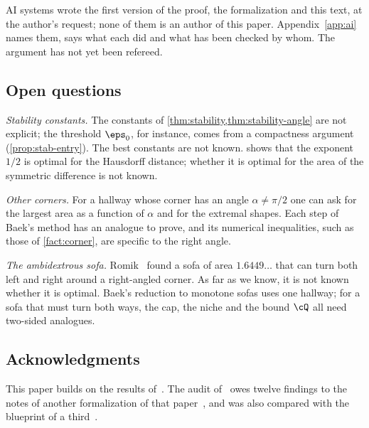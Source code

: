 AI systems wrote the first version of the proof, the formalization and this
text, at the author's request; none of them is an author of this paper.
Appendix~\ref{app:ai} names them, says what each did and what has been checked
by whom.
The argument has not yet been refereed.

\subsection{Open questions}

\emph{Stability constants.} The constants of
\cref{thm:stability,thm:stability-angle} are not explicit; the threshold
$\eps_0$, for instance, comes from a compactness argument
(\cref{prop:stab-entry}). The best constants are not known.
 shows that the exponent $1/2$ is optimal for the
Hausdorff distance; whether it is optimal for the area of the symmetric
difference is not known.

\emph{Other corners.} For a hallway whose corner has an angle $\alpha\ne\pi/2$
one can ask for the largest area as a function of $\alpha$ and for the extremal
shapes. Each step of Baek's method has an analogue to prove, and its numerical
inequalities, such as those of \cref{fact:corner}, are specific to the right
angle.

\emph{The ambidextrous sofa.} Romik~\cite{Romik18} found a sofa of area
$1.6449\ldots$ that can turn both left and right around a right-angled corner.
As far as we know, it is not known whether it is optimal. Baek's reduction to
monotone sofas uses one hallway; for a sofa that must turn both ways, the cap,
the niche and the bound $\cQ$ all need two-sided analogues.

\subsection*{Acknowledgments}
This paper builds on the results of~\cite{Baek}. The audit of~\cite{Baek} owes
twelve findings to the notes of another formalization of that
paper~\cite{Cureton}, and was also compared with the blueprint of a
third~\cite{Cao}.
